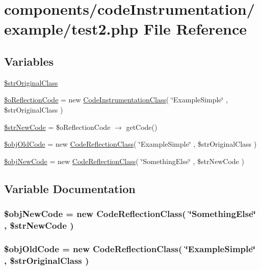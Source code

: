 \hypertarget{test2_8php}{
\section{components/codeInstrumentation/example/test2.php File Reference}
\label{test2_8php}
}
\subsection*{Variables}
\begin{CompactItemize}
\item 
\hyperlink{test2_8php_1ac33ebb6e938d93add7631fafed358a}{\$strOriginalClass}
\item 
\hyperlink{test2_8php_dff853bfc3335950f89bfb9e1a779c7e}{\$oReflectionCode} = new \hyperlink{class_code_instrumentation_class}{CodeInstrumentationClass}( \char`\"{}ExampleSimple\char`\"{} , \$strOriginalClass )
\item 
\hyperlink{test2_8php_882f0b62de6f379d0e0cf88ef6658601}{\$strNewCode} = \$oReflectionCode $\rightarrow$ getCode()
\item 
\hyperlink{test2_8php_34775dfd2d211eafdfc4ca0c32336a2a}{\$objOldCode} = new \hyperlink{class_code_reflection_class}{CodeReflectionClass}( \char`\"{}ExampleSimple\char`\"{} , \$strOriginalClass )
\item 
\hyperlink{test2_8php_2706d26c6080a6989ab38b87786b8935}{\$objNewCode} = new \hyperlink{class_code_reflection_class}{CodeReflectionClass}( \char`\"{}SomethingElse\char`\"{} , \$strNewCode )
\end{CompactItemize}


\subsection{Variable Documentation}
\hypertarget{test2_8php_2706d26c6080a6989ab38b87786b8935}{
\subsubsection[{\$objNewCode}]{\setlength{\rightskip}{0pt plus 5cm}\$objNewCode = new {\bf CodeReflectionClass}( \char`\"{}SomethingElse\char`\"{} , \$strNewCode )}}
\label{test2_8php_2706d26c6080a6989ab38b87786b8935}


\hypertarget{test2_8php_34775dfd2d211eafdfc4ca0c32336a2a}{
\subsubsection[{\$objOldCode}]{\setlength{\rightskip}{0pt plus 5cm}\$objOldCode = new {\bf CodeReflectionClass}( \char`\"{}ExampleSimple\char`\"{} , \$strOriginalClass )}}
\label{test2_8php_34775dfd2d211eafdfc4ca0c32336a2a}


